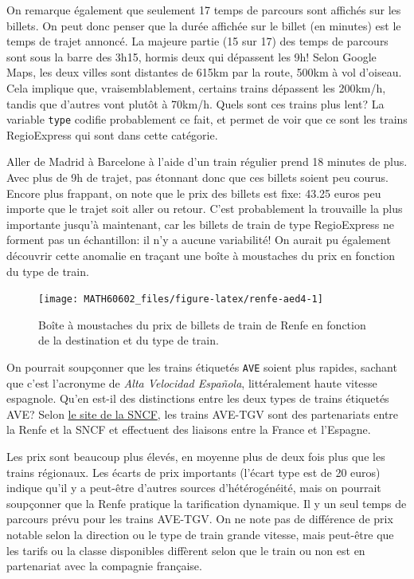 \documentclass[
  11pt,
  letterpaper,
]{book}
\theoremstyle{definition}
\theoremstyle{definition}
\theoremstyle{definition}
\theoremstyle{remark}
\begin{document}
On remarque également que seulement 17 temps de parcours sont affichés sur les billets. On peut donc penser que la durée affichée sur le billet (en minutes) est le temps de trajet annoncé. La majeure partie (15 sur 17) des temps de parcours sont sous la barre des 3h15, hormis deux qui dépassent les 9h! Selon Google Maps, les deux villes sont distantes de 615km par la route, 500km à vol d'oiseau. Cela implique que, vraisemblablement, certains trains dépassent les 200km/h, tandis que d'autres vont plutôt à 70km/h. Quels sont ces trains plus lent? La variable \texttt{type} codifie probablement ce fait, et permet de voir que ce sont les trains RegioExpress qui sont dans cette catégorie.

Aller de Madrid à Barcelone à l'aide d'un train régulier prend 18 minutes de plus. Avec plus de 9h de trajet, pas étonnant donc que ces billets soient peu courus. Encore plus frappant, on note que le prix des billets est fixe: 43.25 euros peu importe que le trajet soit aller ou retour. C'est probablement la trouvaille la plus importante jusqu'à maintenant, car les billets de train de type RegioExpress ne forment pas un échantillon: il n'y a aucune variabilité! On aurait pu également découvrir cette anomalie en traçant une boîte à moustaches du prix en fonction du type de train.

\begin{figure}

{\centering \texttt{[image: MATH60602\_files/figure-latex/renfe-aed4-1]} 

}

\caption{Boîte à moustaches du prix de billets de train de Renfe en fonction de la destination et du type de train.}\label{fig:renfe-aed4}
\end{figure}

On pourrait soupçonner que les trains étiquetés \texttt{AVE} soient plus rapides, sachant que c'est l'acronyme de \emph{Alta Velocidad Española}, littéralement haute vitesse espagnole. Qu'en est-il des distinctions entre les deux types de trains étiquetés AVE? Selon \href{https://www.renfe-sncf.com/rw-en/services/a-unique-experience/Pages/services.aspx}{le site de la SNCF}, les trains AVE-TGV sont des partenariats entre la Renfe et la SNCF et effectuent des liaisons entre la France et l'Espagne.

Les prix sont beaucoup plus élevés, en moyenne plus de deux fois plus que les trains régionaux. Les écarts de prix importants (l'écart type est de 20 euros) indique qu'il y a peut-être d'autres sources d'hétérogénéité, mais on pourrait soupçonner que la Renfe pratique la tarification dynamique. Il y un seul temps de parcours prévu pour les trains AVE-TGV. On ne note pas de différence de prix notable selon la direction ou le type de train grande vitesse, mais peut-être que les tarifs ou la classe disponibles diffèrent selon que le train ou non est en partenariat avec la compagnie française.
\end{document}
